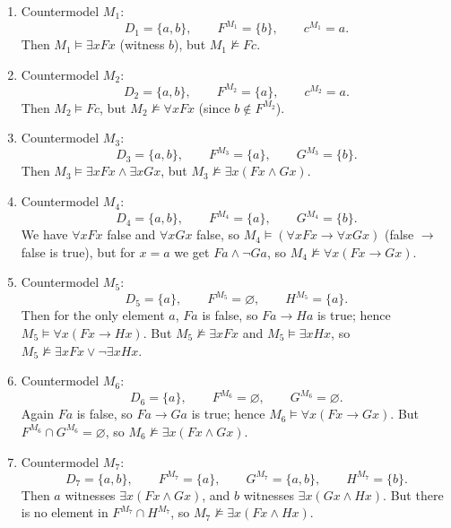 \documentclass[12pt,fleqn]{article}
\begin{document}
\begin{enumerate}
  \item[\(1.\)]
  Countermodel \(M_1\):
  \[
  D_1 = \{a,b\},\qquad
  F^{M_1} = \{b\},\qquad
  c^{M_1} = a.
  \]
  Then \(M_1 \vDash \exists x Fx\) (witness \(b\)), but \(M_1 \nvDash Fc\).

  \item[\(2.\)]
  Countermodel \(M_2\):
  \[
  D_2 = \{a,b\},\qquad
  F^{M_2} = \{a\},\qquad
  c^{M_2} = a.
  \]
  Then \(M_2 \vDash Fc\), but \(M_2 \nvDash \forall x Fx\) (since \(b \notin F^{M_2}\)).

  \item[\(3.\)]
  Countermodel \(M_3\):
  \[
  D_3 = \{a,b\},\qquad
  F^{M_3} = \{a\},\qquad
  G^{M_3} = \{b\}.
  \]
  Then \(M_3 \vDash \exists x Fx \wedge \exists x Gx\), but
  \(M_3 \nvDash \exists x (Fx \wedge Gx)\).

  \item[\(4.\)]
  Countermodel \(M_4\):
  \[
  D_4 = \{a,b\},\qquad
  F^{M_4} = \{a\},\qquad
  G^{M_4} = \{b\}.
  \]
  We have \(\forall x Fx\) false and \(\forall x Gx\) false, so
  \(M_4 \vDash (\forall x Fx \to \forall x Gx)\) (false $\to$ false is true),
  but for \(x=a\) we get \(Fa \wedge \neg Ga\), so
  \(M_4 \nvDash \forall x(Fx \to Gx)\).

  \item[\(5.\)]
  Countermodel \(M_5\):
  \[
  D_5 = \{a\},\qquad
  F^{M_5} = \varnothing,\qquad
  H^{M_5} = \{a\}.
  \]
  Then for the only element \(a\), \(Fa\) is false, so \(Fa \to Ha\) is true;
  hence \(M_5 \vDash \forall x(Fx \to Hx)\).
  But \(M_5 \nvDash \exists x Fx\) and \(M_5 \vDash \exists x Hx\),
  so \(M_5 \nvDash \exists x Fx \vee \neg \exists x Hx\).

  \item[\(6.\)]
  Countermodel \(M_6\):
  \[
  D_6 = \{a\},\qquad
  F^{M_6} = \varnothing,\qquad
  G^{M_6} = \varnothing.
  \]
  Again \(Fa\) is false, so \(Fa \to Ga\) is true; hence
  \(M_6 \vDash \forall x(Fx \to Gx)\).
  But \(F^{M_6} \cap G^{M_6} = \varnothing\), so
  \(M_6 \nvDash \exists x(Fx \wedge Gx)\).

  \item[\(7.\)]
  Countermodel \(M_7\):
  \[
  D_7 = \{a,b\},\qquad
  F^{M_7} = \{a\},\qquad
  G^{M_7} = \{a,b\},\qquad
  H^{M_7} = \{b\}.
  \]
  Then \(a\) witnesses \(\exists x(Fx \wedge Gx)\),
  and \(b\) witnesses \(\exists x(Gx \wedge Hx)\).
  But there is no element in \(F^{M_7} \cap H^{M_7}\), so
  \(M_7 \nvDash \exists x(Fx \wedge Hx)\).


\end{enumerate}
\end{document}

